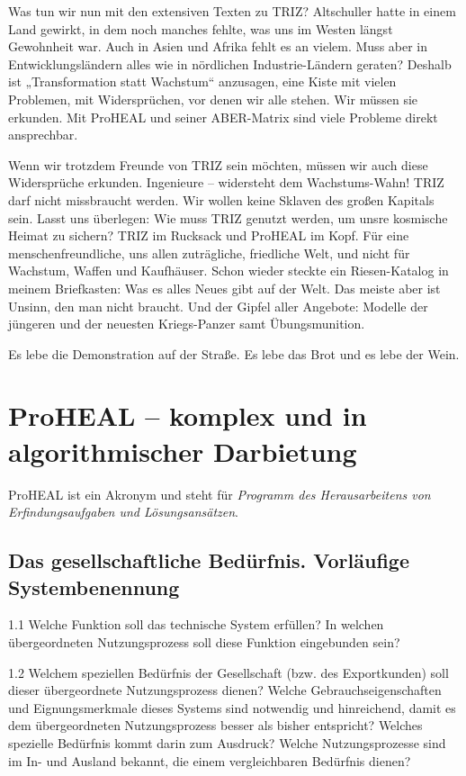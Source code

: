 \documentclass[12pt,a4paper]{article}
\begin{document}
Was tun wir nun mit den extensiven Texten zu TRIZ? Altschuller hatte in einem
Land gewirkt, in dem noch manches fehlte, was uns im Westen längst Gewohnheit
war.  Auch in Asien und Afrika fehlt es an vielem. Muss aber in
Entwicklungsländern alles wie in nördlichen Industrie-Ländern geraten? Deshalb
ist „Transformation statt Wachstum“ anzusagen, eine Kiste mit vielen Problemen,
mit Widersprüchen, vor denen wir alle stehen. Wir müssen sie erkunden. Mit
ProHEAL und seiner ABER-Matrix sind viele Probleme direkt ansprechbar.

Wenn wir trotzdem Freunde von TRIZ sein möchten, müssen wir auch diese
Widersprüche erkunden. Ingenieure – widersteht dem Wachstums-Wahn! TRIZ darf
nicht missbraucht werden. Wir wollen keine Sklaven des großen Kapitals sein.
Lasst uns überlegen: Wie muss TRIZ genutzt werden, um unsre kosmische Heimat zu
sichern? TRIZ im Rucksack und ProHEAL im Kopf. Für eine menschenfreundliche,
uns allen zuträgliche, friedliche Welt, und nicht für Wachstum, Waffen und
Kaufhäuser. Schon wieder steckte ein Riesen-Katalog in meinem Briefkasten: Was
es alles Neues gibt auf der Welt. Das meiste aber ist Unsinn, den man nicht
braucht. Und der Gipfel aller Angebote: Modelle der jüngeren und der neuesten
Kriegs-Panzer samt Übungsmunition.

Es lebe die Demonstration auf der Straße. Es lebe das Brot und es lebe der
Wein.

\section{ProHEAL – komplex und in algorithmischer Darbietung}

ProHEAL ist ein Akronym und steht für \emph{Programm des Herausarbeitens von
  Erfindungsaufgaben und Lösungsansätzen}.

\subsection{Das gesellschaftliche Bedürfnis. Vorläufige System\-benennung}

1.1 Welche Funktion soll das technische System erfüllen? In welchen
übergeordneten Nutzungsprozess soll diese Funktion eingebunden sein?

1.2 Welchem speziellen Bedürfnis der Gesellschaft (bzw. des Exportkunden) soll
dieser übergeordnete Nutzungsprozess dienen? Welche Gebrauchseigenschaften und
Eignungsmerkmale dieses Systems sind notwendig und hinreichend, damit es dem
übergeordneten Nutzungsprozess besser als bisher entspricht? Welches spezielle
Bedürfnis kommt darin zum Ausdruck? Welche Nutzungsprozesse sind im In- und
Ausland bekannt, die einem vergleichbaren Bedürfnis dienen?
\end{document}
